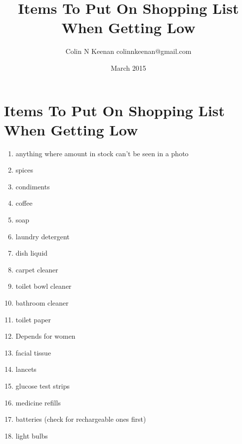 \documentclass[12pt,letterpaper]{article}
\newcommand{\mytitle}{Items To Put On Shopping List When Getting Low}
\begin{document}
\title{\mytitle{}}
\author{Colin N Keenan colinnkeenan@gmail.com}
\date{March 2015}
\section*{\mytitle{}}
\begin{enumerate}
	\item anything where amount in stock can't be seen in a photo
	\item spices
	\item condiments
	\item coffee
	\item soap
	\item laundry detergent
	\item dish liquid
	\item carpet cleaner
	\item toilet bowl cleaner
	\item bathroom cleaner
	\item toilet paper
	\item Depends for women
	\item facial tissue
	\item lancets
	\item glucose test strips
	\item medicine refills
	\item batteries (check for rechargeable ones first)
	\item light bulbs
\end{enumerate}
\end{document}
